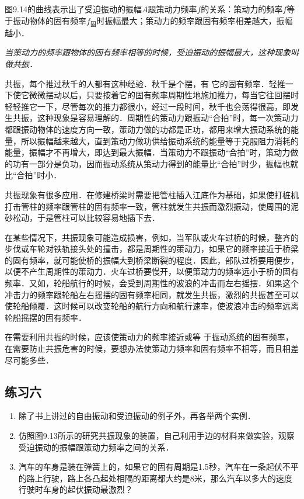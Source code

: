 图9.14的曲线表示出了受迫振动的振幅$A$跟策动力频率$f$的关系：策动力的频率$f$等于振动物体的固有频率$f_{\text{固}}$时振幅最大；策动力的频率跟固有频率相差越大，振幅越小．

\textit{当策动力的频率跟物体的固有频率相等的时候，受迫振动的振幅最大，这种现象叫做共振．}

共振，每个推过秋千的人都有这种经验．秋千是个摆，有
它的固有频率．轻推一下使它微微摆动以后，只要按着它的固有频率周期性地施加推力，每当它往回摆时轻轻推它一下，尽管每次的推力都很小，经过一段时间，秋千也会荡得很高，即发生共振，这种现象是容易理解的．周期性的策动力跟振动“合拍”时，每一次策动力都跟振动物体的速度方向一致，策动力做的功都是正功，都用来增大振动系统的能量，所以振幅越来越大，直到策动力做功供给振动系统的能量等于克服阻力消耗的能量，振幅才不再增大，即达到最大振幅．当策动力不跟振动“合拍”时，策动力做的功有一部分是负功，因而振动系统从策动力得到的能量比“合拍”时少，振幅也就比“合拍”时小．

共振现象有很多应用．在修建桥梁时需要把管柱插入江底作为基础，如果使打桩机打击管柱的频率跟管柱的固有频率一致，管柱就发生共振而激烈振动，使周围的泥砂松动，于是管柱可以比较容易地插下去．

在某些情况下，共振现象可能造成损害，例如，当军队或火车过桥的时候，整齐的步伐或车轮对铁轨接头处的撞击，都是周期性的策动力，如果它的频率接近于桥梁的固有频率，就可能使桥的振幅大到桥梁断裂的程度．因此，部队过桥要用便步，以便不产生周期性的策动力．火车过桥要慢开，以便策动力的频率远小于桥的固有频率．又如，轮船航行的时候，会受到周期性的波浪的冲击而左右摇摆．如果这个冲击力的频率跟轮船左右摇摆的固有频率相同，就发生共振，激烈的共振甚至可以使轮船倾覆．这时候可以改变轮船的航行方向和航行速率，使波浪冲击的频率远离轮船摇摆的固有频率．

在需要利用共振的时候，应该使策动力的频率接近或等
于振动系统的固有频率，在需要防止共振危害的时候，要想办法使策动力频率和固有频率不相等，而且相差尽可能多些．

\subsection*{练习六}
\begin{enumerate}
    \item 除了书上讲过的自由振动和受迫振动的例子外，再各举两个实例．
    \item 仿照图9.13所示的研究共振现象的装置，自己利用手边的材料来做实验，观察受迫振动的振幅跟策动力频率之间的关系．
    \item 汽车的车身是装在弹簧上的，如果它的固有周期是1.5秒，汽车在一条起伏不平的路上行驶，路上各凸起处相隔的距离都大约是8米，那么汽车以多大的速度行驶时车身的起伏振动最激烈？
\end{enumerate}


